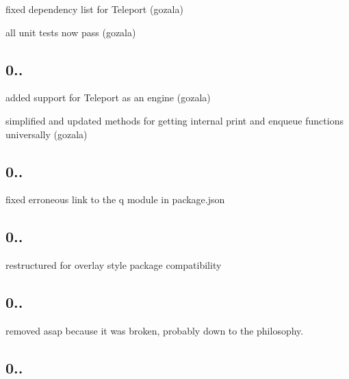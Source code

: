 \begin{DoxyItemize}
\item fixed dependency list for Teleport (gozala)
\item all unit tests now pass (gozala)
\end{DoxyItemize}

\subsection*{0..}


\begin{DoxyItemize}
\item added support for Teleport as an engine (gozala)
\item simplified and updated methods for getting internal print and enqueue functions universally (gozala)
\end{DoxyItemize}

\subsection*{0..}


\begin{DoxyItemize}
\item fixed erroneous link to the q module in package.\+json
\end{DoxyItemize}

\subsection*{0..}


\begin{DoxyItemize}
\item restructured for overlay style package compatibility
\end{DoxyItemize}

\subsection*{0..}


\begin{DoxyItemize}
\item removed asap because it was broken, probably down to the philosophy.
\end{DoxyItemize}

\subsection*{0..}


